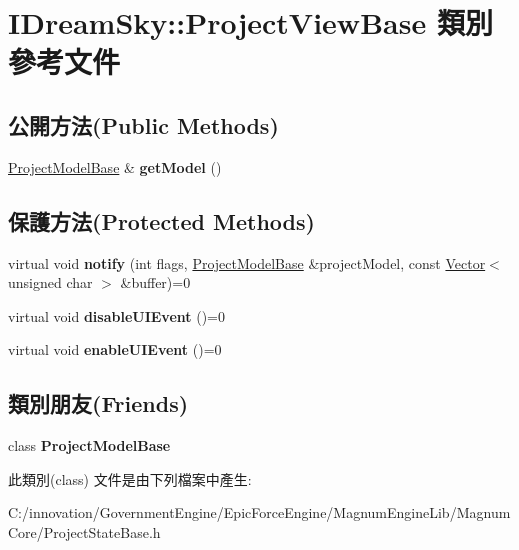 \hypertarget{class_i_dream_sky_1_1_project_view_base}{}\section{I\+Dream\+Sky\+:\+:Project\+View\+Base 類別 參考文件}
\label{class_i_dream_sky_1_1_project_view_base}
\subsection*{公開方法(Public Methods)}
\begin{DoxyCompactItemize}
\item 
\hyperlink{class_i_dream_sky_1_1_project_model_base}{Project\+Model\+Base} \& {\bfseries get\+Model} ()\hypertarget{class_i_dream_sky_1_1_project_view_base_a39ea4ff48e177359c6c492694357c77c}{}\label{class_i_dream_sky_1_1_project_view_base_a39ea4ff48e177359c6c492694357c77c}

\end{DoxyCompactItemize}
\subsection*{保護方法(Protected Methods)}
\begin{DoxyCompactItemize}
\item 
virtual void {\bfseries notify} (int flags, \hyperlink{class_i_dream_sky_1_1_project_model_base}{Project\+Model\+Base} \&project\+Model, const \hyperlink{class_i_dream_sky_1_1_vector}{Vector}$<$ unsigned char $>$ \&buffer)=0\hypertarget{class_i_dream_sky_1_1_project_view_base_a40e209961b059031a8c173c83fc971ff}{}\label{class_i_dream_sky_1_1_project_view_base_a40e209961b059031a8c173c83fc971ff}

\item 
virtual void {\bfseries disable\+U\+I\+Event} ()=0\hypertarget{class_i_dream_sky_1_1_project_view_base_a2f6b63ed8e95e2083b7a3b12c6cdf078}{}\label{class_i_dream_sky_1_1_project_view_base_a2f6b63ed8e95e2083b7a3b12c6cdf078}

\item 
virtual void {\bfseries enable\+U\+I\+Event} ()=0\hypertarget{class_i_dream_sky_1_1_project_view_base_a674587a5a53a3be6c1c5224c2c495271}{}\label{class_i_dream_sky_1_1_project_view_base_a674587a5a53a3be6c1c5224c2c495271}

\end{DoxyCompactItemize}
\subsection*{類別朋友(Friends)}
\begin{DoxyCompactItemize}
\item 
class {\bfseries Project\+Model\+Base}\hypertarget{class_i_dream_sky_1_1_project_view_base_a4adee89a75f9facb060d3c44ba6db2ed}{}\label{class_i_dream_sky_1_1_project_view_base_a4adee89a75f9facb060d3c44ba6db2ed}

\end{DoxyCompactItemize}


此類別(class) 文件是由下列檔案中產生\+:\begin{DoxyCompactItemize}
\item 
C\+:/innovation/\+Government\+Engine/\+Epic\+Force\+Engine/\+Magnum\+Engine\+Lib/\+Magnum\+Core/Project\+State\+Base.\+h\end{DoxyCompactItemize}
